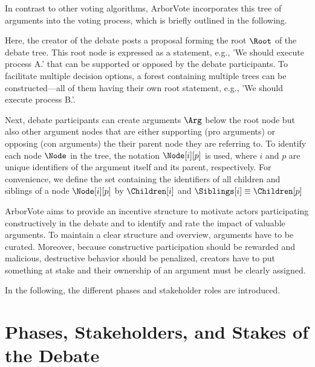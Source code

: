 \documentclass[%
aip,
amsmath,amssymb,
reprint,%
unsortedaddress,
nofootinbib
]{revtex4-2}
\begin{document}
In contrast to other voting algorithms, ArborVote incorporates this tree of arguments into the voting process,
which is briefly outlined in the following.

Here, the creator of the debate posts a proposal forming the root $\Root$ of the debate tree.
This root node is expressed as a statement, e.g., 'We should execute process A.'
that can be supported or opposed by the debate participants.
To facilitate multiple decision options, 
a forest containing
multiple trees can be constructed---all of them having their own root statement, 
e.g., 'We should execute process B.'.

Next, debate participants can create arguments $\Arg$ below the root node
but also other argument nodes that are either supporting (pro arguments) or opposing (con arguments) the their parent node they are referring to.
%
To identify each node $\Node$ in the tree, the notation $\Node[i][p]$ is used, 
where $i$ and $p$ are unique identifiers of the argument itself and its parent, respectively.
For convenience, we define the set containing the identifiers of all children and siblings of a node $\Node[i][p]$ by $\Children[i]$ and $\Siblings[i]\equiv\Children[p]$


ArborVote aims to provide an incentive structure 
to motivate actors participating constructively in the debate and 
to identify and rate the impact of valuable arguments.
To maintain a clear structure and overview, arguments have to be curated.
Moreover, because constructive participation should be rewarded and malicious, destructive behavior should be penalized, 
creators have to put something at stake
and their ownership of an argument must be clearly assigned.

In the following, the different phases and stakeholder roles are introduced.

\section{Phases, Stakeholders, and Stakes of the Debate}\label{sec:DebatingProcess}
\end{document}
